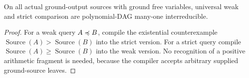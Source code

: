 \begin{corollary}\label{cor:ground-equivalence}
On all actual ground-output sources with ground free variables, universal
weak and strict comparison are polynomial-DAG many-one interreducible.
\end{corollary}
\begin{proof}
For a weak query $A\preccurlyeq B$, compile the existential counterexample
$\operatorname{Source}(A)>\operatorname{Source}(B)$ into the strict version.
For a strict query compile $\operatorname{Source}(A)\ge\operatorname{Source}(B)$
into the weak version.  No recognition of a positive arithmetic fragment is
needed, because the compiler accepts arbitrary supplied ground-source leaves.
\end{proof}

